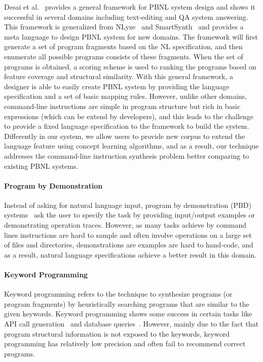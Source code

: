 Desai et al.~\cite{DBLP:journals/corr/DesaiGHJKMRR15} provides a general framework for PBNL system design and shows it successful in several domains including text-editing and QA system answering. This framework is generalized from NLyze~\cite{DBLP:conf/sigmod/GulwaniM14} and SmartSynth~\cite{DBLP:conf/mobisys/LeGS13} and provides a meta language to design PBNL system for new domains. The framework will first generate a set of program fragments based on the NL specification, and then enumerate all possible programs consists of these fragments. When the set of programs is obtained, a scoring scheme is used to ranking the programs based on feature coverage and structural similarity. With this general framework, a designer is able to easily create PBNL system by providing the language specification and a set of basic mapping rules. However, unlike other domains, command-line instructions are simple in program structure but rich in basic expressions (which can be extend by developers), and this leads to the challenge to provide a fixed language specification to the framework to build the system. Differently in our system, we allow users to provide new corpus to extend the language feature using concept learning algorithms, and as a result, our technique addresses the command-line instruction synthesis problem better comparing to existing PBNL systems.

\paragraph{Program by Demonstration} Instead of asking for natural language input, program by demonstration (PBD) systems~\cite{DBLP:journals/ml/LauWDW03, DBLP:journals/cacm/GulwaniHS12, DBLP:conf/pldi/HarrisG11, DBLP:conf/popl/Gulwani11} ask the user to specify the task by providing input/output examples or demonstrating operation traces. However, as many tasks achieve by command lines instructions are hard to sample and often involve operations on a large set of files and directories, demonstrations are examples are hard to hand-code, and as a result, natural language specifications achieve a better result in this domain.

\paragraph{Keyword Programming} Keyword programming refers to the technique to synthesize programs (or program fragments) by heuristically searching programs that are similar to the given keywords. Keyword programming shows some success in certain tasks like API call generation~\cite{DBLP:journals/ase/LittleM09, DBLP:conf/pldi/MandelinXBK05} and database queries~\cite{DBLP:conf/icde/AgrawalCD02, DBLP:conf/icde/BhalotiaHNCS02}. However, mainly due to the fact that program structural information is not exposed to the keywords, keyword programming has relatively low precision and often fail to recommend correct programs.

